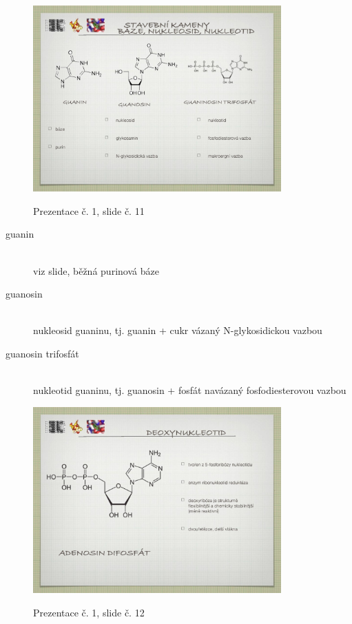 \documentclass[DIV=8]{scrreprt}
\begin{document}
\begin{figure}
    \caption{Prezentace č. 1, slide č. 11}
    \includegraphics[width=0.85\textwidth]{slides-1/slide-11.jpg}
    \centering
    \label{slides-1-slide-11}
\end{figure}

\begin{description}
\item[guanin]\hfill \\
viz slide, běžná purinová báze


\item[guanosin]\hfill \\
nukleosid guaninu, tj. guanin + cukr vázaný N-glykosidickou vazbou


\item[guanosin trifosfát]\hfill \\
nukleotid guaninu, tj. guanosin + fosfát navázaný fosfodiesterovou vazbou

\end{description}


\begin{figure}
    \caption{Prezentace č. 1, slide č. 12}
    \includegraphics[width=0.85\textwidth]{slides-1/slide-12.jpg}
    \centering
    \label{slides-1-slide-12}
\end{figure}
\end{document}
